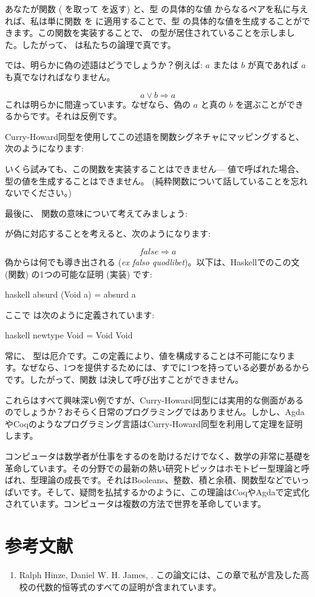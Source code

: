 あなたが関数  ( を取って  を返す) と、型  の具体的な値  からなるペアを私に与えれば、私は単に関数  を  に適用することで、型  の具体的な値を生成することができます。この関数を実装することで、 の型が居住されていることを示しました。したがって、 は私たちの論理で真です。

では、明らかに偽の述語はどうでしょうか？例えば: $a$ または $b$ が真であれば $a$ も真でなければなりません。

\[a \vee b \Rightarrow a\]
これは明らかに間違っています。なぜなら、偽の $a$ と真の $b$ を選ぶことができるからです。それは反例です。

Curry-Howard同型を使用してこの述語を関数シグネチャにマッピングすると、次のようになります: 

いくら試みても、この関数を実装することはできません--- 値で呼ばれた場合、 型の値を生成することはできません。 (純粋関数について話していることを忘れないでください。) 

最後に、 関数の意味について考えてみましょう: 

 が偽に対応することを考えると、次のようになります: 

\[\mathit{false} \Rightarrow a\]
偽からは何でも導き出される (\emph{ex falso quodlibet})。以下は、Haskellでのこの文 (関数) の1つの可能な証明 (実装) です: 

\begin{snip}{haskell}
absurd (Void a) = absurd a
\end{snip}
ここで  は次のように定義されています: 

\begin{snip}{haskell}
newtype Void = Void Void
\end{snip}
常に、 型は厄介です。この定義により、値を構成することは不可能になります。なぜなら、1つを提供するためには、すでに1つを持っている必要があるからです。したがって、関数  は決して呼び出すことができません。

これらはすべて興味深い例ですが、Curry-Howard同型には実用的な側面があるのでしょうか？おそらく日常のプログラミングではありません。しかし、AgdaやCoqのようなプログラミング言語はCurry-Howard同型を利用して定理を証明します。

コンピュータは数学者が仕事をするのを助けるだけでなく、数学の非常に基礎を革命しています。その分野での最新の熱い研究トピックはホモトピー型理論と呼ばれ、型理論の成長です。それはBooleans、整数、積と余積、関数型などでいっぱいです。そして、疑問を払拭するかのように、この理論はCoqやAgdaで定式化されています。コンピュータは複数の方法で世界を革命しています。

\section{参考文献}

\begin{enumerate}
  \tightlist
  \item
        Ralph Hinze, Daniel W. H. James,
        . この論文には、この章で私が言及した高校の代数的恒等式のすべての証明が含まれています。
\end{enumerate}
